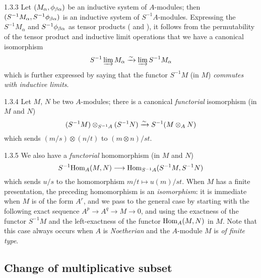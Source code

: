 \begin{env}{1.3.3}
\label{env-0.1.3.3}
Let $(M_\alpha,\phi_{\beta\alpha})$ be an inductive system of $A$-modules; then
$(S^{-1}M_\alpha,S^{-1}\phi_{\beta\alpha})$ is an inductive system of $S^{-1}A$-modules.
Expressing the $S^{-1}M_\alpha$ and $S^{-1}\phi_{\beta\alpha}$ as tensor products
( and ), it follows from the permutability of the tensor
product and inductive limit operations that we have a canonical isomorphism
\[
  S^{-1}\varinjlim M_\alpha\xrightarrow{\sim}\varinjlim S^{-1}M_\alpha
\]
which is further expressed by saying that the functor $S^{-1}M$ (in $M$) \emph{commutes with
inductive limits}.
\end{env}

\begin{env}{1.3.4}
\label{env-0.1.3.4}
Let $M$, $N$ be two $A$-modules; there is a canonical \emph{functorial} isomorphism (in $M$
and $N$)
\[
  (S^{-1}M)\otimes_{S^{-1}A}(S^{-1}N)\xrightarrow{\sim} S^{-1}(M\otimes_A N)
\]
which sends $(m/s)\otimes(n/t)$ to $(m\otimes n)/st$.
\end{env}

\begin{env}{1.3.5}
\label{env-0.1.3.5}
We also have a \emph{functorial} homomorphism (in $M$ and $N$)
\[
  S^{-1}{\mathop{\mathrm{Hom}}\nolimits}_A(M,N)\longrightarrow{\mathop{\mathrm{Hom}}\nolimits}_{S^{-1}A}(S^{-1}M,S^{-1}N)
\]
which sends $u/s$ to the homomorphism $m/t\mapsto u(m)/st$. When $M$ has a finite
presentation, the preceding homomorphism is an \emph{isomorphism}: it is immediate when $M$
is of the form $A^r$, and we pass to the general case by starting with the following exact
sequence $A^p\to A^q\to M\to 0$, and using the exactness of the functor $S^{-1}M$ and
the left-exactness of the functor ${\mathop{\mathrm{Hom}}\nolimits}_A(M,N)$ in $M$. Note that this case always occurs
when $A$ is \emph{Noetherian} and the $A$-module $M$ is \emph{of finite type}.
\end{env}

\subsection{Change of multiplicative subset}
\label{0-prelim-1.4}

